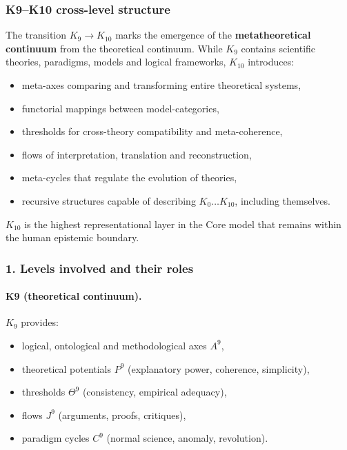 
\subsubsection{K9–K10 cross-level structure}
\label{sec:crossk-k9-k10}

The transition $K_9 \rightarrow K_{10}$ marks the emergence of the
\textbf{metatheoretical continuum} from the theoretical continuum.
While $K_9$ contains scientific theories, paradigms, models and logical
frameworks, $K_{10}$ introduces:
\begin{itemize}
  \item meta-axes comparing and transforming entire theoretical systems,
  \item functorial mappings between model-categories,
  \item thresholds for cross-theory compatibility and meta-coherence,
  \item flows of interpretation, translation and reconstruction,
  \item meta-cycles that regulate the evolution of theories,
  \item recursive structures capable of describing $K_0 \dots K_{10}$,
        including themselves.
\end{itemize}

$K_{10}$ is the highest representational layer in the Core model that remains
within the human epistemic boundary.

\subsubsection{1. Levels involved and their roles}

\paragraph{K9 (theoretical continuum).}
$K_9$ provides:
\begin{itemize}
  \item logical, ontological and methodological axes $A^9$,
  \item theoretical potentials $P^9$ (explanatory power, coherence, simplicity),
  \item thresholds $\Theta^9$ (consistency, empirical adequacy),
  \item flows $J^9$ (arguments, proofs, critiques),
  \item paradigm cycles $C^9$ (normal science, anomaly, revolution).
\end{itemize}

